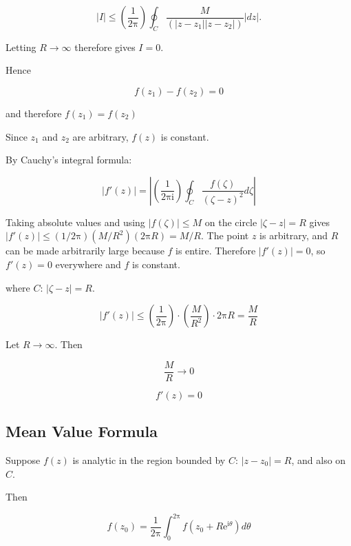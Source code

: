 \documentclass[11pt,a4paper]{article}
\theoremstyle{definition}
\theoremstyle{plain}
\begin{document}
\[
\vert{}I\vert{} \le\left(\frac{1}{2\mathrm{\pi}}\right)\oint_{C}\frac{M}{(\vert{}z - z_{1}\vert{}\vert{}z - z_{2}\vert{})}\vert{}dz\vert{}.
\]

Letting $R \to \infty$ therefore gives $I = 0$.

Hence

\begin{equation}
f(z_{1}) - f(z_{2}) = 0
\end{equation}

and therefore $f(z_{1}) = f(z_{2})$

Since $z_{1}$ and $z_{2}$ are arbitrary, $f(z)$ is constant.

By Cauchy's integral formula:

\begin{equation}
\vert{}f'(z)\vert{} = \left\vert{}\left(\frac{1}{2\mathrm{\pi}\mathrm{i}}\right)\oint_{C}\frac{f(\zeta)}{(\zeta - z)^{2}}d\zeta\right\vert{}
\end{equation}

Taking absolute values and using $\vert{}f(\zeta)\vert{} \le M$ on the circle $\vert{}\zeta - z\vert{} = R$ gives $\vert{}f'(z)\vert{} \le(1/2\mathrm{\pi})(M/R^{2})(2\mathrm{\pi}R) = M/R$. The point $z$ is arbitrary, and $R$ can be made arbitrarily large because $f$ is entire. Therefore $\vert{}f'(z)\vert{} = 0$, so $f'(z) = 0$ everywhere and $f$ is constant.

where $C$: $\vert{}\zeta - z\vert{} = R$.

\begin{equation}
\vert{}f'(z)\vert{} \le\left(\frac{1}{2\mathrm{\pi}}\right) \cdot\left(\frac{M}{R^{2}}\right) \cdot 2\mathrm{\pi}R = \frac{M}{R}
\end{equation}

Let $R \to \infty$. Then

\begin{equation}
\frac{M}{R} \to 0
\end{equation}

\[
f'(z) = 0
\]

\subsection{Mean Value Formula}

Suppose $f(z)$ is analytic in the region bounded by $C$: $\vert{}z - z_{0}\vert{} = R$, and also on $C$.

Then

\begin{equation}
f(z_{0}) = \frac{1}{2\mathrm{\pi}}\int_{0}^{2\mathrm{\pi}}f(z_{0} + R\mathrm{e}^{\mathrm{i}\theta})d\theta
\end{equation}
\end{document}
